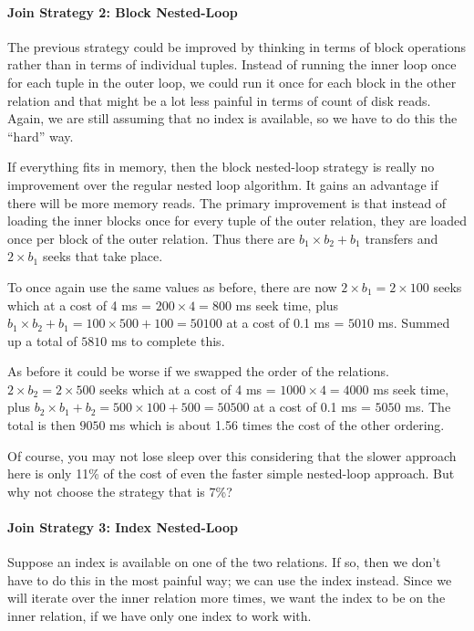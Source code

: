 \paragraph{Join Strategy 2: Block Nested-Loop}
The previous strategy could be improved by thinking in terms of block operations rather than in terms of individual tuples. Instead of running the inner loop once for each tuple in the outer loop, we could run it once for each block in the other relation and that might be a lot less painful in terms of count of disk reads. Again, we are still assuming that no index is available, so we have to do this the ``hard'' way.

If everything fits in memory, then the block nested-loop strategy is really no improvement over the regular nested loop algorithm. It gains an advantage if there will be more memory reads. The primary improvement is that instead of loading the inner blocks once for every tuple of the outer relation, they are loaded once per block of the outer relation. Thus there are $b_{1} \times b_{2} + b_{1}$ transfers and $2\times b_{1}$ seeks that take place.

To once again use the same values as before, there are now $2 \times b_{1} = 2 \times 100 $ seeks which at a cost of 4 ms = $200 \times 4 = 800$ ms seek time, plus $b_{1} \times b_{2} + b_{1} = 100 \times 500 + 100 = 50100$ at a cost of 0.1 ms = $5010$ ms. Summed up a total of $5810$ ms to complete this.

As before it could be worse if we swapped the order of the relations. $2 \times b_{2} = 2 \times 500 $ seeks which at a cost of 4 ms = $1000 \times 4 = 4000$ ms seek time, plus $b_{2} \times b_{1} + b_{2} = 500 \times 100 + 500 = 50500$ at a cost of 0.1 ms = $5050$ ms. The total is then $9050$ ms which is about 1.56 times the cost of the other ordering. 

Of course, you may not lose sleep over this considering that the slower approach here is only 11\% of the cost of even the faster simple nested-loop approach. But why not choose the strategy that is 7\%? 

\paragraph{Join Strategy 3: Index Nested-Loop}
Suppose an index is available on one of the two relations. If so, then we don't have to do this in the most painful way; we can use the index instead. Since we will iterate over the inner relation more times, we want the index to be on the inner relation, if we have only one index to work with.


